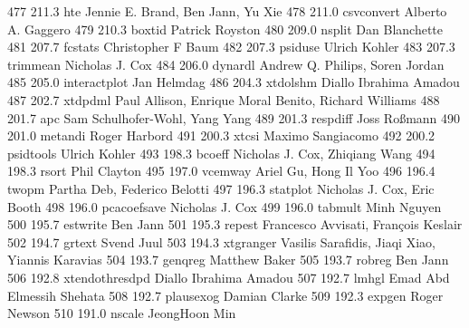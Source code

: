    477    211.3    hte           Jennie E. Brand, Ben Jann, Yu Xie       
   478    211.0    csvconvert    Alberto A. Gaggero                      
   479    210.3    boxtid        Patrick Royston                         
   480    209.0    nsplit        Dan Blanchette                          
   481    207.7    fcstats       Christopher F Baum                      
   482    207.3    psiduse       Ulrich Kohler                           
   483    207.3    trimmean      Nicholas J. Cox                         
   484    206.0    dynardl       Andrew Q. Philips, Soren Jordan         
   485    205.0    interactplot  Jan Helmdag                             
   486    204.3    xtdolshm      Diallo Ibrahima Amadou                  
   487    202.7    xtdpdml       Paul Allison, Enrique Moral Benito,     
                                   Richard Williams                        
   488    201.7    apc           Sam Schulhofer-Wohl, Yang Yang          
   489    201.3    respdiff      Joss Roßmann                           
   490    201.0    metandi       Roger Harbord                           
   491    200.3    xtcsi         Maximo Sangiacomo                       
   492    200.2    psidtools     Ulrich Kohler                           
   493    198.3    bcoeff        Nicholas J. Cox, Zhiqiang Wang          
   494    198.3    rsort         Phil Clayton                            
   495    197.0    vcemway       Ariel Gu, Hong Il Yoo                   
   496    196.4    twopm         Partha Deb, Federico Belotti            
   497    196.3    statplot      Nicholas J. Cox, Eric Booth             
   498    196.0    pcacoefsave   Nicholas J. Cox                         
   499    196.0    tabmult       Minh Nguyen                             
   500    195.7    estwrite      Ben Jann                                
   501    195.3    repest        Francesco Avvisati, François Keslair   
   502    194.7    grtext        Svend Juul                              
   503    194.3    xtgranger     Vasilis Sarafidis, Jiaqi Xiao, Yiannis  
                                   Karavias                                
   504    193.7    genqreg       Matthew Baker                           
   505    193.7    robreg        Ben Jann                                
   506    192.8    xtendothresdpd  Diallo Ibrahima Amadou                  
   507    192.7    lmhgl         Emad Abd Elmessih Shehata               
   508    192.7    plausexog     Damian Clarke                           
   509    192.3    expgen        Roger Newson                            
   510    191.0    nscale        JeongHoon Min                           
